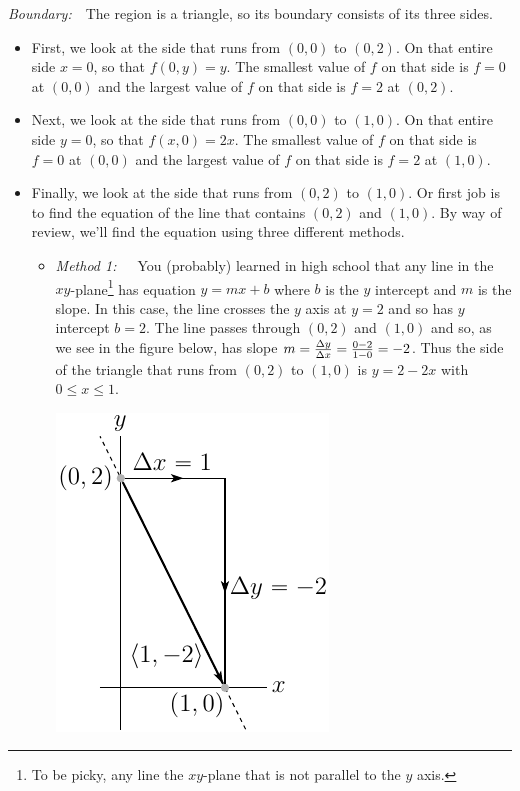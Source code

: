 \begin{eg}
\smallskip
\noindent\emph{Boundary:}\ \ 
The region is a triangle, so its boundary consists of its three sides.
\begin{itemize}
\item 
First, we look at the side that runs from $(0,0)$ to $(0,2)$.
On that entire side $x=0$, so that $f(0,y)=y$. The smallest value of $f$
on that side is $f=0$ at $(0,0)$ and the largest value of $f$
on that side is $f=2$ at $(0,2)$.
\item 
Next, we look at the side that runs from $(0,0)$ to $(1,0)$.
On that entire side $y=0$, so that $f(x,0)=2x$. The smallest value of $f$
on that side is $f=0$ at $(0,0)$ and the largest value of $f$
on that side is $f=2$ at $(1,0)$.
\item
 Finally,  we look at the side that runs from $(0,2)$ to $(1,0)$.
Or first job is to find the equation of the line that contains 
$(0,2)$ and $(1,0)$. By way of review, we'll find the equation using three 
different methods.
\begin{itemize}\itemsep1pt \parskip0pt 
\item \emph{Method 1:}\ \ \ 
 You (probably) learned in high school that any line in 
the $xy$-plane\footnote{To be picky, any line the $xy$-plane that is not parallel to the $y$ axis.}
has equation $y=mx + b$ where $b$ is the $y$ intercept and $m$ is the slope.
In this case, the line crosses the $y$ axis at $y=2$ and so has $y$ intercept 
$b=2$. The line passes through $(0,2)$ and $(1,0)$ and so, as we see in the figure below, has slope
$m=\frac{\Delta y}{\Delta x}=\frac{0-2}{1-0}=-2$. Thus the side of the triangle that 
runs from $(0,2)$ to $(1,0)$ is $y=2-2x$ with $0\le x\le 1$.
\begin{efig}
\begin{center}
   \includegraphics{optExampleCCc}
\end{center}
\end{efig}


\end{itemize}
\end{itemize}
\end{eg}
